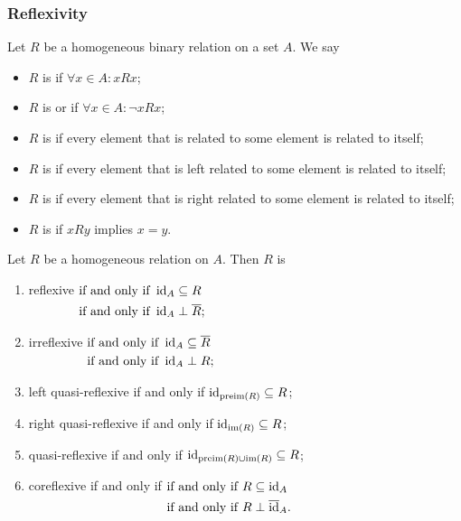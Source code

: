 \subsubsection{Reflexivity}
\begin{definition}
Let $R$ be a homogeneous binary relation on a set $A$. We say
\begin{itemize}
\item $R$ is  if $\forall x\in A: xRx$;
\item $R$ is  or  if $\forall x\in A: \neg xRx$;
\item $R$ is  if every element that is related to some element is related to itself;
\item $R$ is  if every element that is left related to some element is related to itself;
\item $R$ is  if every element that is right related to some element is related to itself;
\item $R$ is  if $xRy$ implies $x=y$.
\end{itemize}
\end{definition}

\begin{lemma}
Let $R$ be a homogeneous relation on $A$. Then $R$ is
\begin{enumerate}
\item reflexive $\begin{aligned}[t]
&\text{\textup{if and only if}}\; \operatorname{id}_A \subseteq R \\
&\text{\textup{if and only if}}\; \operatorname{id}_A \perp \overline{R};
\end{aligned}$
\item irreflexive $\begin{aligned}[t]
&\text{\textup{if and only if}}\; \operatorname{id}_A \subseteq \overline{R} \\
&\text{\textup{if and only if}}\; \operatorname{id}_A \perp R;
\end{aligned}$
\item left quasi-reflexive \textup{if and only if} $\operatorname{id}_{\operatorname{preim}(R)} \subseteq R$;
\item right quasi-reflexive \textup{if and only if} $\operatorname{id}_{\operatorname{im}(R)} \subseteq R$;
\item quasi-reflexive \textup{if and only if} $\operatorname{id}_{\operatorname{preim}(R)\cup \operatorname{im}(R)} \subseteq R$;
\item coreflexive \textup{if and only if} $\begin{aligned}[t]
&\text{\textup{if and only if}}\; R \subseteq \operatorname{id}_A \\
&\text{\textup{if and only if}}\; R \perp \overline{\operatorname{id}}_A.
\end{aligned}$
\end{enumerate}
\end{lemma}

